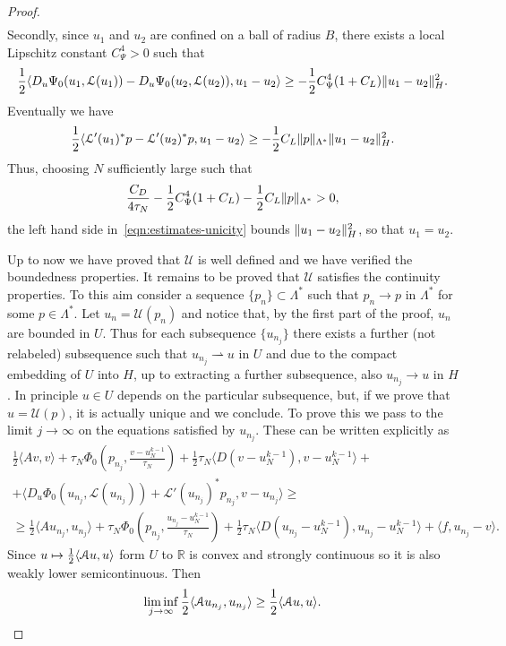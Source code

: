 \documentclass[a4paper,10pt,oneside]{amsbook}
\numberwithin{section}{chapter}
\numberwithin{equation}{chapter}
\theoremstyle{definition}
\DeclarePairedDelimiter{\norm}{\lVert}{\rVert}
\DeclarePairedDelimiter{\dual}{\langle}{\rangle}
\begin{document}
\begin{proof}
\[\begin{multlined}
\end{multlined}
\]
Secondly, since $u_1$ and $u_2$ are confined on a ball of radius $B$, there exists a local Lipschitz constant $C_\Psi^4>0$ such that
\[
\frac{1}{2}\langle D_u\Psi_0(u_1,\mathcal{L}(u_1))-D_u\Psi_0(u_2,\mathcal{L}(u_2)),u_1-u_2\rangle\ge-\frac{1}{2}C_\Psi^4(1+C_L)\norm{u_1-u_2}_H^2.
\]
Eventually we have
\[
\frac{1}{2}\langle\mathcal{L}'(u_1)^*p-\mathcal{L}'(u_2)^*p,u_1-u_2\rangle\ge-\frac{1}{2}C_L\norm{p}_{\Lambda^*}\norm{u_1-u_2}_H^2.
\]
Thus, choosing $N$ sufficiently large such that
\[
\frac{C_D}{4\tau_N}-\frac{1}{2}C_\Psi^4(1+C_L)-\frac{1}{2}C_L\norm{p}_{\Lambda^*}>0,
\]
the left hand side in~\eqref{eqn:estimates-unicity} bounds $\norm{u_1-u_2}_H^2$, so that $u_1=u_2$.

Up to now we have proved that $\mathcal{U}$ is well defined and we have verified the boundedness properties. It remains to be proved that $\mathcal{U}$ satisfies the continuity properties. To this aim consider a sequence $\{p_n\}\subset\Lambda^*$ such that $p_n\to p$ in $\Lambda^*$ for some $p\in\Lambda^*$. Let $u_n=\mathcal{U}(p_n)$ and notice that, by the first part of the proof, $u_n$ are bounded in $U$. Thus for each subsequence $\{u_{n_j}\}$ there exists a further (not relabeled) subsequence such that $u_{n_j}\rightharpoonup u$ in $U$ and due to the compact embedding of $U$ into $H$, up to extracting a further subsequence, also $u_{n_j}\to u$ in $H$. In principle $u\in U$ depends on the particular subsequence, but, if we prove that $u=\mathcal{U}(p)$, it is actually unique and we conclude. To prove this we pass to the limit $j\to\infty$ on the equations satisfied by $u_{n_j}$. These can be written explicitly as
\[
\begin{multlined}
\frac{1}{2}\langle Av,v\rangle+\tau_N\Phi_0\left(p_{n_j},\frac{v-u_N^{k-1}}{\tau_N}\right)+\frac{1}{2}\tau_N\langle D(v-u_N^{k-1}),v-u_N^{k-1}\rangle+\\
+\langle D_u\Phi_0(u_{n_j},\mathcal{L}(u_{n_j}))+\mathcal{L}'(u_{n_j})^*p_{n_j},v-u_{n_j}\rangle\ge\\
\ge\frac{1}{2}\langle Au_{n_j},u_{n_j}\rangle+\tau_N\Phi_0\left(p_{n_j},\frac{u_{n_j}-u_N^{k-1}}{\tau_N}\right)+\frac{1}{2}\tau_N\langle D(u_{n_j}-u_N^{k-1}),u_{n_j}-u_N^{k-1}\rangle+\langle f,u_{n_j}-v\rangle.
\end{multlined}
\]
Since $u\mapsto\frac{1}{2}\dual{\mathcal{A}u,u}$ form $U$ to $\mathbb{R}$ is convex and strongly continuous so it is also weakly lower semicontinuous. Then
\[
\liminf_{j\to\infty}\frac{1}{2}\dual{\mathcal{A}u_{n_j},u_{n_j}}\ge\frac{1}{2}\dual{\mathcal{A}u,u}.
\]
\end{proof}
\end{document}
